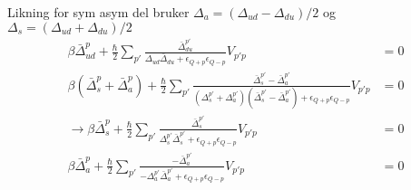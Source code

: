 \documentclass{article}
\begin{document}
Likning for sym asym del bruker $\Delta_a = (\Delta_{ud} - \Delta_{du}) / 2$ og $\Delta_s = (\Delta_{ud} + \Delta_{du}) / 2$
\begin{align}
\beta \bar{\Delta}^{p}_{ud} + \frac{\hbar}{2} \sum_{p'} \frac{\bar{\Delta}_{du}^{p'}}{\Delta_{ud} \bar{\Delta}_{du} + \epsilon_{Q+p} \epsilon_{Q-p}} V_{p'p} &= 0 \nonumber \\
%
\beta (\bar{\Delta}^{p}_{s} + \bar{\Delta}^{p}_{a}) + \frac{\hbar}{2} \sum_{p'} \frac{\bar{\Delta}_{s}^{p'} - \bar{\Delta}_{a}^{p'}}{(\Delta_s^{p'} + \Delta_a^{p'})(\bar{\Delta}_s^{p'} - \bar{\Delta}_a^{p'})  + \epsilon_{Q+p} \epsilon_{Q-p}} V_{p'p} &= 0 \nonumber \\   
%
\rightarrow \beta \bar{\Delta}^{p}_{s} + \frac{\hbar}{2} \sum_{p'} \frac{\bar{\Delta}_{s}^{p'}}{\Delta_s^{p'}\bar{\Delta}_s^{p'}  + \epsilon_{Q+p} \epsilon_{Q-p}} V_{p'p} &= 0 \nonumber \\ 
%
\beta \bar{\Delta}^{p}_{a} + \frac{\hbar}{2} \sum_{p'} \frac{- \bar{\Delta}_{a}^{p'}}{-\Delta_a^{p'}\bar{\Delta}_a^{p'}  + \epsilon_{Q+p} \epsilon_{Q-p}} V_{p'p} &= 0 \nonumber \\
\end{align}
\end{document}

